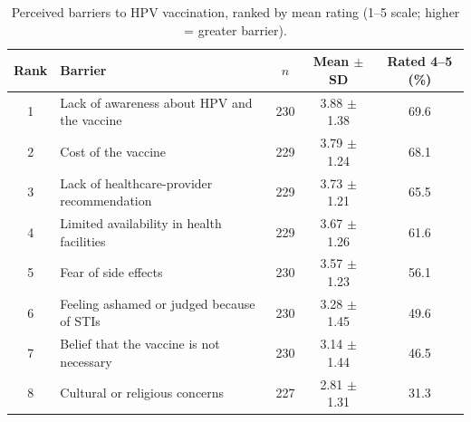 \begin{table}[htbp]\centering\small
\caption{Perceived barriers to HPV vaccination, ranked by mean rating (1--5 scale; higher = greater barrier).}\label{tab:barriers}
\begin{tabularx}{\textwidth}{@{}c >{\raggedright\arraybackslash}X c c c@{}}\toprule
Rank & Barrier & $n$ & Mean $\pm$ SD & Rated 4--5 (\%) \\\midrule
1 & Lack of awareness about HPV and the vaccine & 230 & 3.88 $\pm$ 1.38 & 69.6 \\
2 & Cost of the vaccine & 229 & 3.79 $\pm$ 1.24 & 68.1 \\
3 & Lack of healthcare-provider recommendation & 229 & 3.73 $\pm$ 1.21 & 65.5 \\
4 & Limited availability in health facilities & 229 & 3.67 $\pm$ 1.26 & 61.6 \\
5 & Fear of side effects & 230 & 3.57 $\pm$ 1.23 & 56.1 \\
6 & Feeling ashamed or judged because of STIs & 230 & 3.28 $\pm$ 1.45 & 49.6 \\
7 & Belief that the vaccine is not necessary & 230 & 3.14 $\pm$ 1.44 & 46.5 \\
8 & Cultural or religious concerns & 227 & 2.81 $\pm$ 1.31 & 31.3 \\
\bottomrule\end{tabularx}\end{table}
